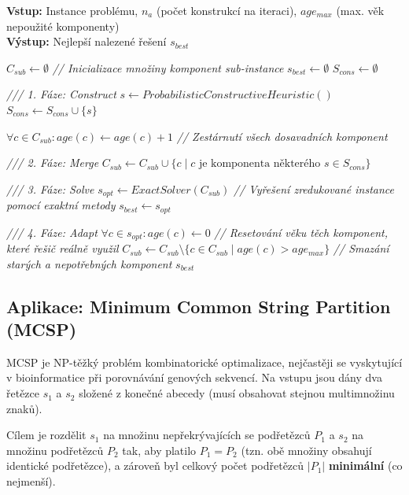 \documentclass[12pt,a4paper]{article}
\theoremstyle{definition}
\begin{document}
\begin{algorithm}[H]
\caption{Construct, Merge, Solve \& Adapt (CMSA)}
\textbf{Vstup:} Instance problému, $n_a$ (počet konstrukcí na iteraci), $age_{max}$ (max. věk nepoužité komponenty) \\
\textbf{Výstup:} Nejlepší nalezené řešení $s_{best}$
\begin{algorithmic}[1]
\STATE $C_{sub} \gets \emptyset$ \textit{// Inicializace množiny komponent sub-instance}
\STATE $s_{best} \gets \emptyset$
    \STATE $S_{cons} \gets \emptyset$
    
    \STATE \textit{/// 1. Fáze: Construct}
        \STATE $s \gets ProbabilisticConstructiveHeuristic()$
        \STATE $S_{cons} \gets S_{cons} \cup \{s\}$
    \ENDFOR
    
    \STATE $\forall c \in C_{sub}: age(c) \gets age(c) + 1$ \textit{// Zestárnutí všech dosavadních komponent}
    
    \STATE \textit{/// 2. Fáze: Merge}
    \STATE $C_{sub} \gets C_{sub} \cup \{c \mid c \text{ je komponenta některého } s \in S_{cons}\}$
    
    \STATE \textit{/// 3. Fáze: Solve}
    \STATE $s_{opt} \gets ExactSolver(C_{sub})$ \textit{// Vyřešení zredukované instance pomocí exaktní metody}
        \STATE $s_{best} \gets s_{opt}$
    \ENDIF
    
    \STATE \textit{/// 4. Fáze: Adapt}
    \STATE $\forall c \in s_{opt}: age(c) \gets 0$ \textit{// Resetování věku těch komponent, které řešič reálně využil}
    \STATE $C_{sub} \gets C_{sub} \setminus \{c \in C_{sub} \mid age(c) > age_{max}\}$ \textit{// Smazání starých a nepotřebných komponent}
\ENDWHILE
\RETURN $s_{best}$
\end{algorithmic}
\end{algorithm}

\subsection{Aplikace: Minimum Common String Partition (MCSP)}
MCSP je NP-těžký problém kombinatorické optimalizace, nejčastěji se vyskytující v bioinformatice při porovnávání genových sekvencí. Na vstupu jsou dány dva řetězce $s_1$ a $s_2$ složené z konečné abecedy (musí obsahovat stejnou multimnožinu znaků). 

Cílem je rozdělit $s_1$ na množinu nepřekrývajících se podřetězců $P_1$ a $s_2$ na množinu podřetězců $P_2$ tak, aby platilo $P_1 = P_2$ (tzn. obě množiny obsahují identické podřetězce), a zároveň byl celkový počet podřetězců $|P_1|$ \textbf{minimální} (co nejmenší).
\end{document}
